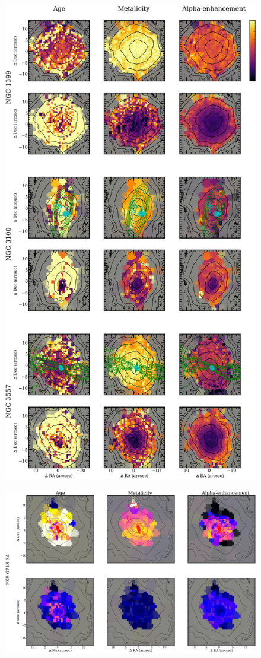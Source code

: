 {{\begin{figure}
		\includegraphics[height=0.94\textheight]{chapter4/vimos/pop3.png}
	\end{figure}
	\begin{figure}
		\centering
		\includegraphics[height=0.31\textheight]{chapter4/vimos/pop4.png}

\end{figure}}}
